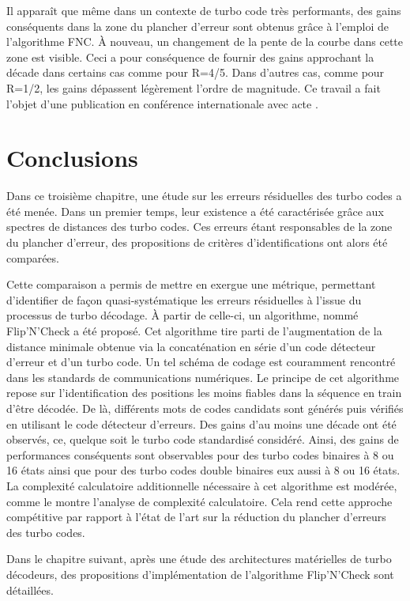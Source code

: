 Il apparaît que même dans un contexte de turbo code très performants, des gains conséquents dans la zone du plancher d'erreur 
sont obtenus grâce à l'emploi de l'algorithme FNC. À nouveau, un changement de la pente de la courbe dans cette zone est
visible. Ceci a pour conséquence de fournir des gains approchant la décade dans certains cas comme pour R=4/5. Dans d'autres
cas, comme pour R=1/2, les gains dépassent légèrement l'ordre de magnitude. Ce travail a fait l'objet d'une publication en
conférence internationale avec acte .

\section{Conclusions}
Dans ce troisième chapitre, une étude sur les erreurs résiduelles des turbo codes a été menée. Dans un premier temps,
leur existence a été caractérisée grâce aux spectres de distances des turbo codes. Ces erreurs étant responsables de 
la zone du plancher d'erreur, des propositions de critères d'identifications ont alors été comparées.

Cette comparaison a permis de mettre en exergue une métrique, permettant d'identifier de façon quasi-systématique
les erreurs résiduelles à l'issue du processus de turbo décodage. À partir de celle-ci, un algorithme, nommé Flip'N'Check
a été proposé. Cet algorithme tire parti de l'augmentation de la distance minimale obtenue via la concaténation en série 
d'un code détecteur d'erreur et d'un turbo code. Un tel schéma de codage est couramment rencontré dans les standards de 
communications numériques. Le principe de cet algorithme repose sur l'identification des positions les moins fiables dans la séquence en train 
d'être décodée. De là, différents mots de codes candidats sont générés puis vérifiés en utilisant le code détecteur d'erreurs.
Des gains d'au moins une décade ont été observés, ce, quelque soit le turbo code standardisé considéré. Ainsi, des gains
de performances conséquents sont observables pour des turbo codes binaires à 8 ou 16 états ainsi que pour des turbo codes 
double binaires eux aussi à 8 ou 16 états. La complexité calculatoire additionnelle nécessaire à cet algorithme est modérée,
comme le montre l'analyse de complexité calculatoire.
Cela rend cette approche compétitive par rapport à l’état de l'art sur la réduction du plancher d'erreurs des turbo codes.

Dans le chapitre suivant, après une étude des architectures matérielles de turbo décodeurs, des propositions d'implémentation 
de l'algorithme Flip'N'Check sont détaillées.



